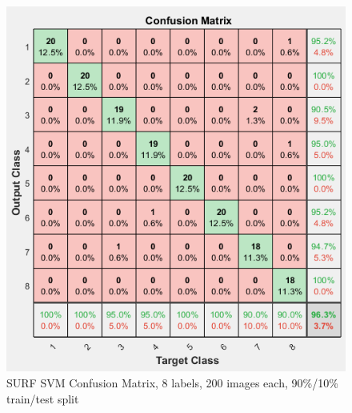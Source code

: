 \begin{figure}[h]
 \centering 
 \includegraphics[width=\columnwidth]{images/SURF-SVM-Conf-Mat-200-gray-0.9.png}
 \caption{SURF SVM Confusion Matrix, 8 labels, 200 images each, 90\%/10\% train/test split}
 \label{fig:surf_conf_mat}
\end{figure} 
